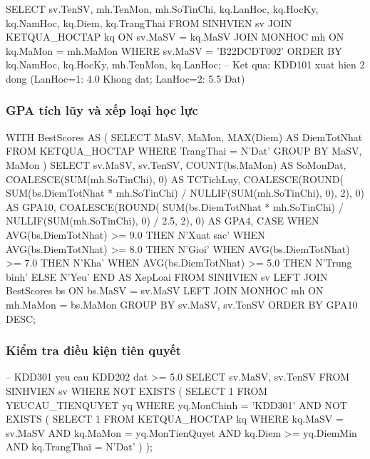 \documentclass[13pt, a4paper]{article}
\begin{document}
\begin{sqlbox}
SELECT sv.TenSV, mh.TenMon, mh.SoTinChi,
       kq.LanHoc, kq.HocKy, kq.NamHoc,
       kq.Diem, kq.TrangThai
FROM   SINHVIEN sv
JOIN   KETQUA_HOCTAP kq ON sv.MaSV  = kq.MaSV
JOIN   MONHOC        mh ON kq.MaMon = mh.MaMon
WHERE  sv.MaSV = 'B22DCDT002'
ORDER  BY kq.NamHoc, kq.HocKy, mh.TenMon, kq.LanHoc;
-- Ket qua: KDD101 xuat hien 2 dong (LanHoc=1: 4.0 Khong dat; LanHoc=2: 5.5 Dat)
\end{sqlbox}

\subsubsection{GPA tích lũy và xếp loại học lực}

\begin{sqlbox}
WITH BestScores AS (
    SELECT MaSV, MaMon, MAX(Diem) AS DiemTotNhat
    FROM KETQUA_HOCTAP
    WHERE TrangThai = N'Dat'
    GROUP BY MaSV, MaMon
)
SELECT sv.MaSV, sv.TenSV,
       COUNT(bs.MaMon)                                   AS SoMonDat,
       COALESCE(SUM(mh.SoTinChi), 0)                    AS TCTichLuy,
       COALESCE(ROUND(
           SUM(bs.DiemTotNhat * mh.SoTinChi)
           / NULLIF(SUM(mh.SoTinChi), 0), 2), 0)        AS GPA10,
       COALESCE(ROUND(
           SUM(bs.DiemTotNhat * mh.SoTinChi)
           / NULLIF(SUM(mh.SoTinChi), 0) / 2.5, 2), 0) AS GPA4,
       CASE
           WHEN AVG(bs.DiemTotNhat) >= 9.0 THEN N'Xuat sac'
           WHEN AVG(bs.DiemTotNhat) >= 8.0 THEN N'Gioi'
           WHEN AVG(bs.DiemTotNhat) >= 7.0 THEN N'Kha'
           WHEN AVG(bs.DiemTotNhat) >= 5.0 THEN N'Trung binh'
           ELSE N'Yeu'
       END AS XepLoai
FROM SINHVIEN sv
LEFT JOIN BestScores bs ON bs.MaSV  = sv.MaSV
LEFT JOIN MONHOC     mh ON mh.MaMon = bs.MaMon
GROUP BY sv.MaSV, sv.TenSV
ORDER BY GPA10 DESC;
\end{sqlbox}

\subsubsection{Kiểm tra điều kiện tiên quyết}

\begin{sqlbox}
-- KDD301 yeu cau KDD202 dat >= 5.0
SELECT sv.MaSV, sv.TenSV
FROM   SINHVIEN sv
WHERE  NOT EXISTS (
    SELECT 1 FROM YEUCAU_TIENQUYET yq
    WHERE  yq.MonChinh = 'KDD301'
    AND    NOT EXISTS (
        SELECT 1 FROM KETQUA_HOCTAP kq
        WHERE  kq.MaSV       = sv.MaSV
        AND    kq.MaMon      = yq.MonTienQuyet
        AND    kq.Diem      >= yq.DiemMin
        AND    kq.TrangThai  = N'Dat'
    )
);
\end{sqlbox}
\end{document}
